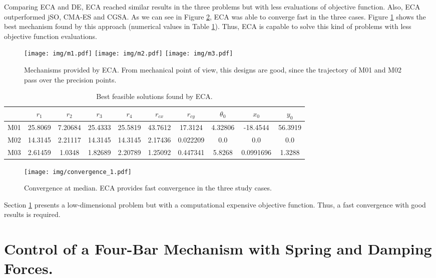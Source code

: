 \documentclass[12pt,letterpape]{article}
\begin{document}
Comparing ECA and DE, ECA reached similar results in the three problems but with
less evaluations of objective function. Also, ECA outperformed jSO, CMA-ES and CGSA.
% 
As we can see in Figure \ref{fig:convMedian1}, ECA was able to converge fast in the
three cases. Figure \ref{fig:optimalM} shows the best mechanism found by this
approach (numerical values in Table \ref{tab:valuesR}). Thus, ECA is capable to
solve this kind of problems with less objective function evaluations.

% 
\begin{figure}[!ht]
	\centering
	\texttt{[image: img/m1.pdf]}
	\texttt{[image: img/m2.pdf]}
	\texttt{[image: img/m3.pdf]}
	\caption{Mechanisms provided by ECA. From mechanical point of view, this designs
	are good, since the trajectory of M01 and M02 pass over the precision points.}
	\label{fig:optimalM}
\end{figure}
% 

\begin{table}[!ht]
	\centering
	\begin{tabular}{cccccccccc}
		    & $r_1$   &  $r_2$  &   $r_3$ &  $r_4$  & $r_{cx}$&$r_{cy}$ &   $\theta_0$ &  $x_0$    & $y_0$ \\ \hline
		M01 & 25.8069 & 7.20684 & 25.4333 & 25.5819 & 43.7612 & 17.3124 & 4.32806 & -18.4544  & 56.3919 \\
		M02 & 14.3145 & 2.21117 & 14.3145 & 14.3145 & 2.17436 & 0.022209&  0.0    &   0.0     & 0.0 \\
		M03 & 2.61459 & 1.0348  & 1.82689 & 2.20789 & 1.25092 & 0.447341& 5.8268  & 0.0991696 & 1.3288 \\
	\end{tabular}
	\caption{Best feasible solutions found by ECA.}
	\label{tab:valuesR}
\end{table}

\begin{figure}[!ht]
	\centering
	\texttt{[image: img/convergence\_1.pdf]}
	\caption{Convergence at median. ECA provides fast convergence in the three study cases.}
	\label{fig:convMedian1}
\end{figure}

Section \ref{sec:control} presents a low-dimensional problem but with a computational
expensive objective function. Thus, a fast convergence with good results is required.

\section{Control of a Four-Bar Mechanism with Spring and Damping Forces.} %
\label{sec:control}
\end{document}
